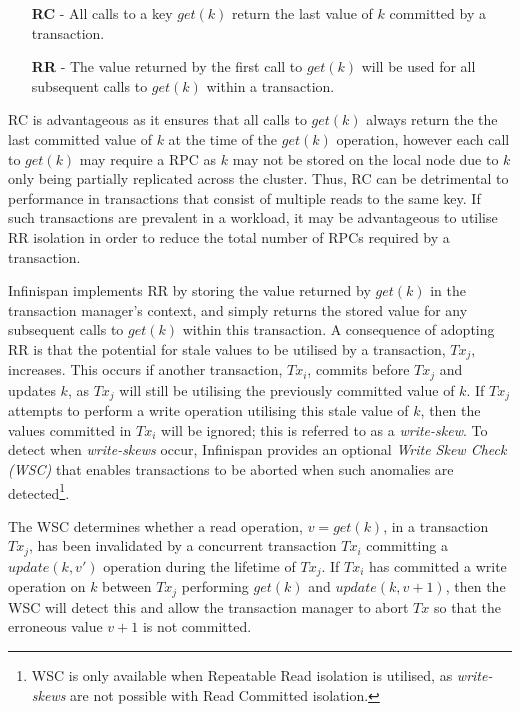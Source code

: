 	        \begin{itemize}
	            \item[\textbf{RC} -] All calls to a key $get(k)$ return the last value of $k$ committed by a transaction.  
	            \item[\textbf{RR} -] The value returned by the first call to $get(k)$ will be used for all subsequent calls to $get(k)$ within a transaction.
	        \end{itemize}   
	        
	        RC is advantageous as it ensures that all calls to $get(k)$ always return the the last committed value of $k$ at the time of the $get(k)$ operation, however each call to $get(k)$ may require a RPC as $k$ may not be stored on the local node due to $k$ only being partially replicated across the cluster. Thus, RC can be detrimental to performance in transactions that consist of multiple reads to the same key.  If such transactions are prevalent in a workload, it may be advantageous to utilise RR isolation in order to reduce the total number of RPCs required by a transaction.  
	        
	        Infinispan implements RR by storing the value returned by $get(k)$ in the transaction manager's context, and simply returns the stored value for any subsequent calls to $get(k)$ within this transaction.  A consequence of adopting RR is that the potential for stale values to be utilised by a transaction, $Tx_j$, increases.  This occurs if another transaction, $Tx_i$, commits before $Tx_j$ and updates $k$, as $Tx_j$ will still be utilising the previously committed value of $k$.  If $Tx_j$ attempts to perform a write operation utilising this stale value of $k$, then the values committed in $Tx_i$ will be ignored; this is referred to as a \emph{write-skew}.  To detect when \emph{write-skews} occur, Infinispan provides an optional \emph{Write Skew Check (WSC)} that enables transactions to be aborted when such anomalies are detected\footnote{WSC is only available when Repeatable Read isolation is utilised, as \emph{write-skews} are not possible with Read Committed isolation.}.  
	        
	        The WSC determines whether a read operation, $v = get(k)$, in a transaction $Tx_j$, has been invalidated by a concurrent transaction $Tx_i$ committing a $update(k, v')$ operation during the lifetime of $Tx_j$.  If $Tx_i$ has committed a write operation on $k$ between $Tx_j$ performing $get(k)$ and $update(k, v+1)$, then the WSC will detect this and allow the transaction manager to abort $Tx$ so that the erroneous value $v+1$ is not committed.  

